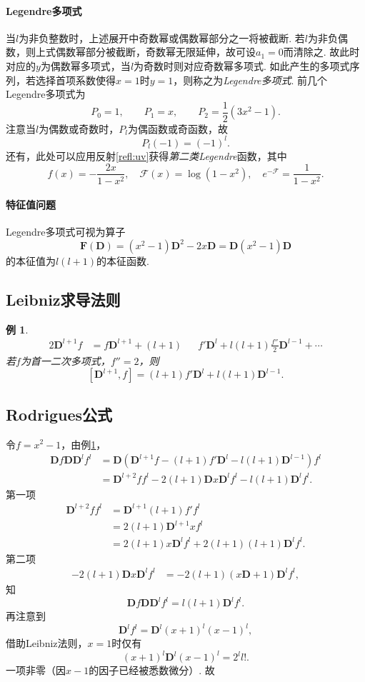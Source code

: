 \documentclass[UTF-8]{ctexart}
\newcommand{\pare}[1]{\left(#1\right)}
\newcommand{\iF}{\mathcal{F}}
\newcommand{\eiF}{e^{-\iF}}
\newcommand{\half}{\frac{1}{2}}
\newcommand{\DD}{\mathbf{D}}
\newcommand{\FF}{\mathbf{F}}
\newtheorem{reflection}{反射}
\newcommand{\refl}[1]{\vspace{0.5em}\par\noindent\fbox{%
    \parbox{\textwidth}{%
    \begin{reflection}
        #1
    \end{reflection}
    }%
}\vspace{0.5em}\par}
\newcommand{\rref}[1]{反射\ref{refl:#1}}
\newcommand{\eref}[1]{例\ref{ex:#1}}
\newtheorem{ex}{例}
\begin{document}
  \paragraph{Legendre多项式}当$l$为非负整数时，上述展开中奇数幂或偶数幂部分之一将被截断. 若$l$为非负偶数，则上式偶数幂部分被截断，奇数幂无限延伸，故可设$a_1=0$而清除之. 故此时对应的$y$为偶数幂多项式，当$l$为奇数时则对应奇数幂多项式. 如此产生的多项式序列，若选择首项系数使得$x=1$时$y=1$，则称之为\emph{Legendre多项式}. 前几个Legendre多项式为
  \[ P_0 = 1, \qquad P_1 = x, \qquad P_2 = \half\pare{3x^2-1}.\]
  注意当$l$为偶数或奇数时，$P_l$为偶函数或奇函数，故
  \[ P_l\pare{-1} = \pare{-1}^l. \]
  还有，此处可以应用\rref{uv}获得\emph{第二类Legendre}函数，其中
  \[ f\pare{x} = -\frac{2x}{1-x^2},\quad \iF\pare{x} = \log\pare{1-x^2},\quad \eiF = \frac{1}{1-x^2}. \]
  \paragraph{特征值问题}
  Legendre多项式可视为算子
  \[ \FF\pare{\DD} = \pare{x^2-1}\DD^2-2x\DD = \DD\pare{x^2-1}\DD \]
  的本征值为$l\pare{l+1}$的本征函数.
  \refl{
    \[ \DD f\DD P_l = l\pare{l+1}P_l. \]
  }
  \subsection{Leibniz求导法则}
  \refl{
    \[ \DD^n\pare{fg} = \sum C_n^r \DD^r f \DD^{n-r} g. \]
    特别地，
    \[ [\DD^n, x] = n\DD^{n-1}. \]
  }
  \begin{ex}
  \label{ex:DfD}
    \begin{alignat*}{2}
    \DD^{l+1}f &= f \DD^{l+1} + \pare{l+1}&&f'\DD^{l} + l\pare{l+1}\frac{f''}{2}\DD^{l-1} + \cdots
    \end{alignat*}
    若$f$为首一二次多项式，$f''=2$，则
    \[ [\DD^{l+1}, f] = \pare{l+1}f'\DD^l + l\pare{l+1}\DD^{l-1}. \]
  \end{ex}
  \subsection{Rodrigues公式}
  令$f = x^2-1$，由\eref{DfD}，
  \begin{align*}
    \DD f\DD \DD ^lf^l &= \DD \pare{\DD ^{l+1}f - \pare{l+1}f'\DD ^l - l\pare{l+1}\DD ^{l-1}}f^l \\
    &= \DD ^{l+2}ff^l - 2\pare{l+1}\DD x\DD ^lf^l - l\pare{l+1}\DD ^lf^l.
  \end{align*}
  第一项
  \begin{align*}
    \DD ^{l+2}ff^l &= \DD ^{l+1}\pare{l+1}f'f^l \\
    &= 2\pare{l+1}\DD ^{l+1}xf^l \\
    &= 2\pare{l+1}x\DD ^lf^l + 2\pare{l+1}\pare{l+1}\DD ^lf^l.
  \end{align*}
  第二项
  \begin{align*}
    -2\pare{l+1}\DD x\DD ^lf^l &= -2\pare{l+1}\pare{x\DD +1}\DD ^lf^l,
  \end{align*}
  知
  \[ \DD f\DD \DD ^lf^l = l\pare{l+1}\DD ^lf^l. \]
  再注意到
  \[ \DD ^lf^l = \DD ^l\pare{x+1}^l\pare{x-1}^l, \]
  借助Leibniz法则，$x=1$时仅有
  \[ \pare{x+1}^l\DD ^l\pare{x-1}^l = 2^l l!. \]
  一项非零（因$x-1$的因子已经被悉数微分）.
  故
  \refl{
    \label{refl:pl}
    \[ P_l = \frac{1}{2^l l!}\DD ^l\pare{x^2-1}^l. \]
  }
\end{document}
